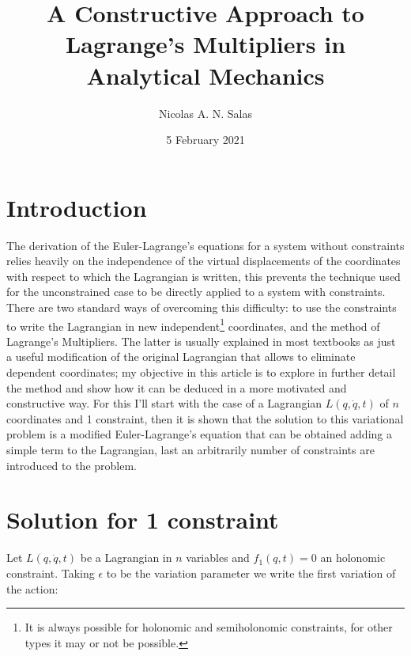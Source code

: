 \documentclass{article}
\title{A Constructive Approach to Lagrange's Multipliers in Analytical Mechanics}
\author{Nicolas A. N. Salas  }
\date{5 February 2021}
\begin{document}
\maketitle

\section{Introduction}
The derivation of the Euler-Lagrange's equations for a system without constraints relies heavily on the independence of the virtual displacements of the coordinates with respect to which the Lagrangian is written, this prevents the technique used for the unconstrained case to be directly applied to a system with constraints. There are two standard ways of overcoming this difficulty: to use the constraints to write the Lagrangian in new independent\footnote{ It is always possible for holonomic and semiholonomic constraints, for other types it may or not be possible. } coordinates, and the method of Lagrange's Multipliers. The latter is usually explained in most textbooks as just a useful modification of the original Lagrangian that allows to eliminate dependent coordinates; my objective in this article is to explore in further detail the method and show how it can be deduced in a more motivated and constructive way. For this I'll start with the case of a Lagrangian $L(q,\dot{q},t)$ of $n$ coordinates and 1 constraint, then it is shown that the solution to this variational problem is a modified Euler-Lagrange's equation that can be obtained adding a simple term to the Lagrangian, last an arbitrarily number of constraints are introduced to the problem.

\section{Solution for 1 constraint}
Let $L(q,\dot{q},t)$ be a Lagrangian in $n$ variables and $f_1(q,t)=0$ an holonomic constraint. Taking $\epsilon$ to be the variation parameter we write the first variation of the action:
\end{document}
